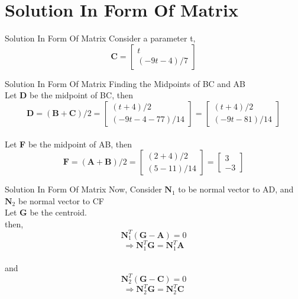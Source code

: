 \documentclass{beamer}
\begin{document}
\section{Solution In Form Of Matrix}
\begin{frame}{Solution In Form Of Matrix}
Consider a parameter t,
\\ \[\textbf{C} = \begin{bmatrix}t \\ (-9t-4)/7\end{bmatrix}\]
\end{frame}
\begin{frame}{Solution In Form Of Matrix}
Finding the Midpoints of BC and AB
\\ Let \textbf{D} be the midpoint of BC, then
\[\textbf{D} = (\textbf{B} + \textbf{C})/2 = \begin{bmatrix}(t+4)/2 \\ (-9t-4-77)/14\end{bmatrix} = \begin{bmatrix}(t+4)/2 \\ (-9t-81)/14\end{bmatrix}\]
\\ Let \textbf{F} be the midpoint of AB, then
\[\textbf{F} = (\textbf{A} + \textbf{B})/2 = \begin{bmatrix}(2+4)/2 \\ (5-11)/14\end{bmatrix} = \begin{bmatrix}3 \\ -3\end{bmatrix}\]
\end{frame}
\begin{frame}{Solution In Form Of Matrix}
Now, Consider $\textbf{N}_1$ to be normal vector to AD, and $\textbf{N}_2$ be normal vector to CF
\\Let \textbf{G} be the centroid.
\\then, \[\textbf{N}_1^T(\textbf{G}-\textbf{A}) = 0\]
\[\Rightarrow \textbf{N}_1^T\textbf{G} = \textbf{N}_1^T\textbf{A}\]
\\and \[\textbf{N}_2^T(\textbf{G}-\textbf{C}) = 0\]
\[\Rightarrow \textbf{N}_2^T\textbf{G} = \textbf{N}_2^T\textbf{C}\]
\end{frame}
\end{document}
